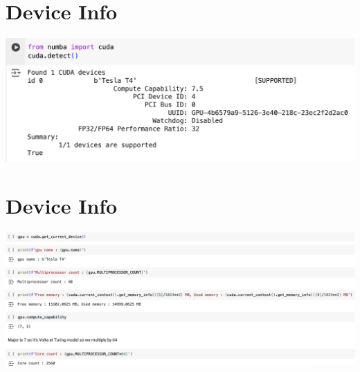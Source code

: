 \documentclass{article}
\begin{document}
\section{Device Info}
\includegraphics[scale=0.5]{src/gpus.png}

\section{Device Info}
\includegraphics[scale=0.5]{src/gpu-infos.png}
\end{document}

